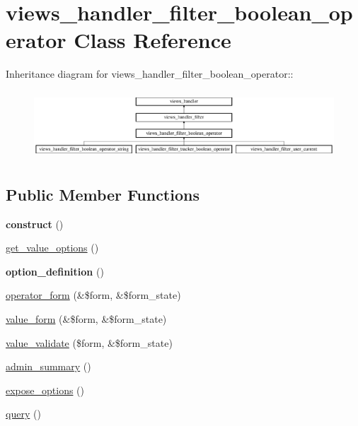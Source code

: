 \hypertarget{classviews__handler__filter__boolean__operator}{
\section{views\_\-handler\_\-filter\_\-boolean\_\-operator Class Reference}
\label{classviews__handler__filter__boolean__operator}
}
Inheritance diagram for views\_\-handler\_\-filter\_\-boolean\_\-operator::\begin{figure}[H]
\begin{center}
\leavevmode
\includegraphics[height=2.59259cm]{classviews__handler__filter__boolean__operator}
\end{center}
\end{figure}
\subsection*{Public Member Functions}
\begin{DoxyCompactItemize}
\item 
\hypertarget{classviews__handler__filter__boolean__operator_a659352df10ef3144359e90247f450ef2}{
{\bfseries construct} ()}
\label{classviews__handler__filter__boolean__operator_a659352df10ef3144359e90247f450ef2}

\item 
\hyperlink{classviews__handler__filter__boolean__operator_ad2c5508cee59025448c3c18a862976d8}{get\_\-value\_\-options} ()
\item 
\hypertarget{classviews__handler__filter__boolean__operator_af2103bf9a481a2a2eb4d5c0e6baf2b77}{
{\bfseries option\_\-definition} ()}
\label{classviews__handler__filter__boolean__operator_af2103bf9a481a2a2eb4d5c0e6baf2b77}

\item 
\hyperlink{classviews__handler__filter__boolean__operator_a2b8c0523843b8f24144bf5a59254cdd9}{operator\_\-form} (\&\$form, \&\$form\_\-state)
\item 
\hyperlink{classviews__handler__filter__boolean__operator_a1680256640c960fef88ad1485cfb91f7}{value\_\-form} (\&\$form, \&\$form\_\-state)
\item 
\hyperlink{classviews__handler__filter__boolean__operator_a9c61464d97fb29d4a481e30f97cb50f9}{value\_\-validate} (\$form, \&\$form\_\-state)
\item 
\hyperlink{classviews__handler__filter__boolean__operator_a7b58a9b58ae9778383b6a215834d7cdb}{admin\_\-summary} ()
\item 
\hyperlink{classviews__handler__filter__boolean__operator_a24ff1f565f02838bc2a63939ab510d89}{expose\_\-options} ()
\item 
\hyperlink{classviews__handler__filter__boolean__operator_ab3afc650701939c060e684d75fa2b21b}{query} ()
\end{DoxyCompactItemize}
